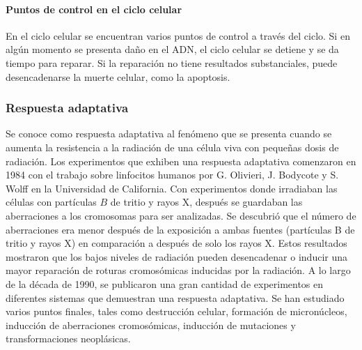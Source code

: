 \paragraph{Puntos de control en el ciclo celular}

En el ciclo celular se encuentran varios puntos de control a través del ciclo. Si en algún momento se presenta daño en el ADN, el ciclo celular se detiene y se da tiempo para reparar. Si la reparación no tiene resultados substanciales, puede desencadenarse la muerte celular, como la apoptosis.


\subsubsection{Respuesta adaptativa}
Se conoce como respuesta adaptativa al fenómeno que se presenta cuando se aumenta la resistencia a la radiación de una  célula viva con pequeñas dosis de radiación.
Los experimentos que exhiben una respuesta adaptativa comenzaron en 1984 con el trabajo sobre linfocitos humanos por G. Olivieri, J. Bodycote y S. Wolff en la Universidad de California. Con experimentos donde irradiaban las células con partículas $B$ de tritio y rayos X, después se guardaban  las aberraciones a los cromosomas para ser analizadas. Se descubrió que el número de aberraciones era menor después de la exposición a ambas fuentes (partículas B de tritio y rayos X) en comparación a después de  solo los rayos X. Estos resultados mostraron que los bajos niveles de radiación pueden desencadenar o inducir una mayor reparación de roturas cromosómicas inducidas por la radiación.
A lo largo de la década de 1990, se publicaron una gran cantidad de experimentos en diferentes sistemas que demuestran una respuesta adaptativa. Se han estudiado varios puntos finales, tales como destrucción celular, formación de micronúcleos, inducción de aberraciones cromosómicas, inducción de mutaciones y transformaciones neoplásicas\cite{Thormod}.
